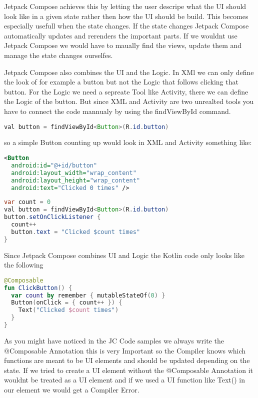 \documentclass[a4paper,11pt]{article}
\begin{document}
Jetpack Compose achieves this by letting the user descripe what the UI should look like in a given state rather then how the UI should be build. This becomes especially usefull when the state changes. If the state changes Jetpack Compose automatically updates and rerenders the important parts. If we wouldnt use Jetpack Compose we would have to maually find the views, update them and manage the state changes ourselfes.

Jetpack Compose also combines the UI and the Logic. In XMl we can only define the look of for example a button but not the Logic that  follows clicking that button. For the Logic we need a sepreate Tool like Activity, there we can define the Logic of the button. But since XML and Activity are two unrealted tools you have to connect the code mannualy by using the findViewById command.
\begin{lstlisting}[language = Java]
val button = findViewById<Button>(R.id.button)
\end{lstlisting}
so a simple Button counting up would look in XML and Activity something like:
\begin{lstlisting}[language=xml, title= {XML UI Button}]
<Button
  android:id="@+id/button"
  android:layout_width="wrap_content"
  android:layout_height="wrap_content"
  android:text="Clicked 0 times" />
\end{lstlisting}
\begin{lstlisting}[language=Java, title= {Activity Logic Button}]
var count = 0
val button = findViewById<Button>(R.id.button)
button.setOnClickListener {
  count++
  button.text = "Clicked $count times"
}
\end{lstlisting}

Since Jetpack Compose combines UI and Logic the Kotlin code only looks like the following
\begin{lstlisting}[language=Kotlin, title= {Jetpack Compose Button}]
@Composable
fun ClickButton() {
  var count by remember { mutableStateOf(0) }
  Button(onClick = { count++ }) {
    Text("Clicked $count times")
  }
}
\end{lstlisting}

As you might have noticed in the JC Code samples we always write the @Composable Annotation  this is very Important so the Compiler knows which functions are meant to be UI elements and should be updated depending on the state. %
If we tried to create a UI element without the @Composable Annotation it wouldnt be treated as a UI element and if we used a UI function like Text() in our element we would get a Compiler Error.
\end{document}
